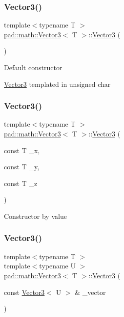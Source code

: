 \subsubsection{\texorpdfstring{Vector3()}{Vector3()}\hspace{0.1cm}{\footnotesize\ttfamily [1/5]}}
{\footnotesize\ttfamily template$<$typename T $>$ \\
\mbox{\hyperlink{structpad_1_1math_1_1_vector3}{pad\+::math\+::\+Vector3}}$<$ T $>$\+::\mbox{\hyperlink{structpad_1_1math_1_1_vector3}{Vector3}} (\begin{DoxyParamCaption}{ }\end{DoxyParamCaption})}

Default constructor

\mbox{\hyperlink{structpad_1_1math_1_1_vector3}{Vector3}} templated in unsigned char \mbox{\label{structpad_1_1math_1_1_vector3_a0770fb886ae92f895ce0258e28a1a1eb}} 
\subsubsection{\texorpdfstring{Vector3()}{Vector3()}\hspace{0.1cm}{\footnotesize\ttfamily [2/5]}}
{\footnotesize\ttfamily template$<$typename T $>$ \\
\mbox{\hyperlink{structpad_1_1math_1_1_vector3}{pad\+::math\+::\+Vector3}}$<$ T $>$\+::\mbox{\hyperlink{structpad_1_1math_1_1_vector3}{Vector3}} (\begin{DoxyParamCaption}\item[{const T}]{\+\_\+x,  }\item[{const T}]{\+\_\+y,  }\item[{const T}]{\+\_\+z }\end{DoxyParamCaption})}

Constructor by value \mbox{\label{structpad_1_1math_1_1_vector3_a7f6a17638301c9ddaec4ea300a3c846a}} 
\subsubsection{\texorpdfstring{Vector3()}{Vector3()}\hspace{0.1cm}{\footnotesize\ttfamily [3/5]}}
{\footnotesize\ttfamily template$<$typename T $>$ \\
template$<$typename U $>$ \\
\mbox{\hyperlink{structpad_1_1math_1_1_vector3}{pad\+::math\+::\+Vector3}}$<$ T $>$\+::\mbox{\hyperlink{structpad_1_1math_1_1_vector3}{Vector3}} (\begin{DoxyParamCaption}\item[{const \mbox{\hyperlink{structpad_1_1math_1_1_vector3}{Vector3}}$<$ U $>$ \&}]{\+\_\+vector }\end{DoxyParamCaption})}

